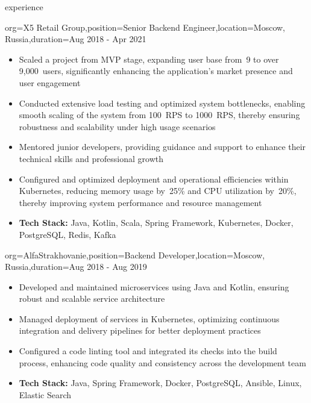\documentclass{resume}
\begin{document}
\begin{ResumeSection}{experience}
    \begin{ResumeSubsection}{org=X5 Retail Group,position=Senior Backend Engineer,location={Moscow, Russia},duration=Aug 2018 - Apr 2021}
        \begin{itemize}
            \item Scaled a project from MVP stage, expanding user base from~9 to over 9,000~users, significantly enhancing the application's market presence and user engagement
            \item Conducted extensive load testing and optimized system bottlenecks, enabling smooth scaling of the system from 100~RPS to 1000~RPS, thereby ensuring robustness and scalability under high usage scenarios
            \item Mentored junior developers, providing guidance and support to enhance their technical skills and professional growth
            \item Configured and optimized deployment and operational efficiencies within Kubernetes, reducing memory usage by~25\% and CPU utilization by~20\%, thereby improving system performance and resource management
            \item \textbf{Tech Stack:} Java, Kotlin, Scala, Spring Framework, Kubernetes, Docker, PostgreSQL, Redis, Kafka
        \end{itemize}
    \end{ResumeSubsection}

    \begin{ResumeSubsection}{org=AlfaStrakhovanie,position=Backend Developer,location={Moscow, Russia},duration=Aug 2018 - Aug 2019}
        \begin{itemize}
            \item Developed and maintained microservices using Java and Kotlin, ensuring robust and scalable service architecture
            \item Managed deployment of services in Kubernetes, optimizing continuous integration and delivery pipelines for better deployment practices
            \item Configured a code linting tool and integrated its checks into the build process, enhancing code quality and consistency across the development team
            \item \textbf{Tech Stack:} Java, Spring Framework, Docker, PostgreSQL, Ansible, Linux, Elastic Search
        \end{itemize}
    \end{ResumeSubsection}


\end{ResumeSection}
\end{document}
